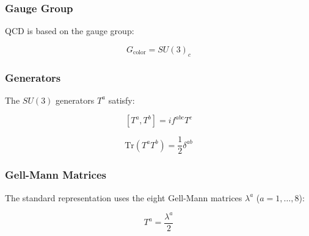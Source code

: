 \subsubsection{Gauge Group}

QCD is based on the gauge group:

\begin{equation}
\label{eq:canonical:su3_group}
G_{\text{color}} = SU(3)_c
\end{equation}

\subsubsection{Generators}

The $SU(3)$ generators $T^a$ satisfy:

\begin{equation}
\label{eq:canonical:su3_commutator}
[T^a, T^b] = i f^{abc} T^c
\end{equation}

\begin{equation}
\label{eq:canonical:su3_normalization}
\text{Tr}(T^a T^b) = \frac{1}{2}\delta^{ab}
\end{equation}

\subsubsection{Gell-Mann Matrices}

The standard representation uses the eight Gell-Mann matrices $\lambda^a$ ($a=1,\ldots,8$):

\begin{equation}
T^a = \frac{\lambda^a}{2}
\end{equation}

